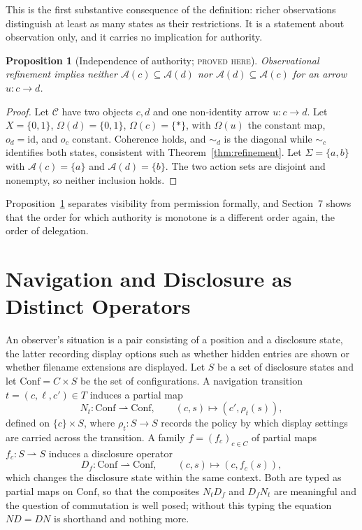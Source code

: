 \documentclass[11pt]{article}
\newtheorem{proposition}[theorem]{Proposition}
\theoremstyle{definition}
\theoremstyle{remark}
\newcommand{\stN}{\textsc{proved here}}
\newcommand{\cC}{\mathcal C}
\newcommand{\cA}{\mathcal A}
\newcommand{\id}{\mathrm{id}}
\newcommand{\pfn}{\rightharpoonup}
\newcommand{\sk}{\sim}
\newcommand{\Conf}{\mathrm{Conf}}
\begin{document}
This is the first substantive consequence of the definition: richer observations distinguish at least as many states as their restrictions. It is a statement about observation only, and it carries no implication for authority.

\begin{proposition}[Independence of authority; \stN]\label{prop:authindep}
Observational refinement implies neither $\cA(c)\subseteq\cA(d)$ nor $\cA(d)\subseteq\cA(c)$ for an arrow $u:c\to d$.
\end{proposition}
\begin{proof}
Let $\cC$ have two objects $c,d$ and one non-identity arrow $u:c\to d$. Let $X=\{0,1\}$, $\Omega(d)=\{0,1\}$, $\Omega(c)=\{\ast\}$, with $\Omega(u)$ the constant map, $o_d=\id$, and $o_c$ constant. Coherence holds, and $\sk_d$ is the diagonal while $\sk_c$ identifies both states, consistent with Theorem~\ref{thm:refinement}. Let $\Sigma=\{a,b\}$ with $\cA(c)=\{a\}$ and $\cA(d)=\{b\}$. The two action sets are disjoint and nonempty, so neither inclusion holds.
\end{proof}

Proposition~\ref{prop:authindep} separates visibility from permission formally, and Section~7 shows that the order for which authority is monotone is a different order again, the order of delegation.

\section{Navigation and Disclosure as Distinct Operators}

An observer's situation is a pair consisting of a position and a disclosure state, the latter recording display options such as whether hidden entries are shown or whether filename extensions are displayed. Let $S$ be a set of disclosure states and let $\Conf=C\times S$ be the set of configurations. A navigation transition $t=(c,\ell,c')\in T$ induces a partial map
\[
N_t:\Conf\pfn\Conf,\qquad (c,s)\mapsto(c',\rho_t(s)),
\]
defined on $\{c\}\times S$, where $\rho_t:S\to S$ records the policy by which display settings are carried across the transition. A family $f=(f_c)_{c\in C}$ of partial maps $f_c:S\pfn S$ induces a disclosure operator
\[
D_f:\Conf\pfn\Conf,\qquad (c,s)\mapsto(c,f_c(s)),
\]
which changes the disclosure state within the same context. Both are typed as partial maps on $\Conf$, so that the composites $N_tD_f$ and $D_fN_t$ are meaningful and the question of commutation is well posed; without this typing the equation $ND=DN$ is shorthand and nothing more.
\end{document}
